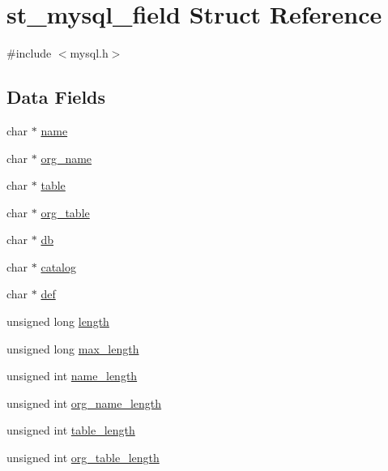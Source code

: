 \hypertarget{structst__mysql__field}{}\section{st\+\_\+mysql\+\_\+field Struct Reference}
\label{structst__mysql__field}


{\ttfamily \#include $<$mysql.\+h$>$}

\subsection*{Data Fields}
\begin{DoxyCompactItemize}
\item 
char $\ast$ \hyperlink{structst__mysql__field_a9aea18cced6a6cd06f9ab3dd75643675}{name}
\item 
char $\ast$ \hyperlink{structst__mysql__field_a03345260f7ab6ff2aab0ee5cda2c8ba3}{org\+\_\+name}
\item 
char $\ast$ \hyperlink{structst__mysql__field_a29e2e9a3a039afd113f5b01144aeadf3}{table}
\item 
char $\ast$ \hyperlink{structst__mysql__field_ade5ec83de3b2537fbffbad382314521f}{org\+\_\+table}
\item 
char $\ast$ \hyperlink{structst__mysql__field_a707bf664b65d46c5fafcc9117d43c3d6}{db}
\item 
char $\ast$ \hyperlink{structst__mysql__field_a5efd1f038fd402730cd69b9b0be93ac6}{catalog}
\item 
char $\ast$ \hyperlink{structst__mysql__field_acd02783a4aa6564a73efd4234043e17b}{def}
\item 
unsigned long \hyperlink{structst__mysql__field_a03ff1a4c1b3d3249d5ff7b1a62f152f3}{length}
\item 
unsigned long \hyperlink{structst__mysql__field_a89db90d875f6b760f147e70ac5f96dce}{max\+\_\+length}
\item 
unsigned int \hyperlink{structst__mysql__field_a9f783bae03537ebb992ca091b7173d92}{name\+\_\+length}
\item 
unsigned int \hyperlink{structst__mysql__field_a76f2446ec6439f82c2d387085498e599}{org\+\_\+name\+\_\+length}
\item 
unsigned int \hyperlink{structst__mysql__field_a3fd823f20119f559007cc41089bec0fe}{table\+\_\+length}
\item 
unsigned int \hyperlink{structst__mysql__field_afa4e4cdb3af1c33edb72757f3fce9e7a}{org\+\_\+table\+\_\+length}
\item 

\end{DoxyCompactItemize}

